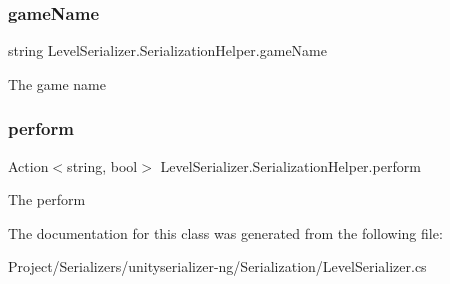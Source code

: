 \subsubsection{\texorpdfstring{game\+Name}{gameName}}
{\footnotesize\ttfamily string Level\+Serializer.\+Serialization\+Helper.\+game\+Name}



The game name 

\mbox{\label{class_level_serializer_1_1_serialization_helper_aa9def6ef5a0e2192b40464483a8ea057}} 
\subsubsection{\texorpdfstring{perform}{perform}}
{\footnotesize\ttfamily Action$<$string, bool$>$ Level\+Serializer.\+Serialization\+Helper.\+perform}



The perform 



The documentation for this class was generated from the following file\+:\begin{DoxyCompactItemize}
\item 
Project/\+Serializers/unityserializer-\/ng/\+Serialization/Level\+Serializer.\+cs\end{DoxyCompactItemize}

